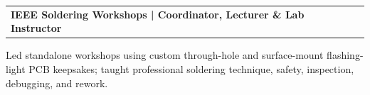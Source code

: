 \documentclass[10pt,letterpaper]{article}
\makeatletter
\newcommand{\resumeentry}[2]{%
  \begin{tabularx}{\textwidth}{@{}X>{\raggedleft\arraybackslash}p{2.40in}@{}}
    \textbf{#1} & #2
  \end{tabularx}\vspace{-0.075cm}
}
\makeatother
\begin{document}
\resumeentry{IEEE Soldering Workshops | Coordinator, Lecturer \& Lab Instructor}{}
\begin{resumebullets}
  \item Led standalone workshops using custom through-hole and surface-mount flashing-light PCB keepsakes; taught professional soldering technique, safety, inspection, debugging, and rework.
\end{resumebullets}
\end{document}
